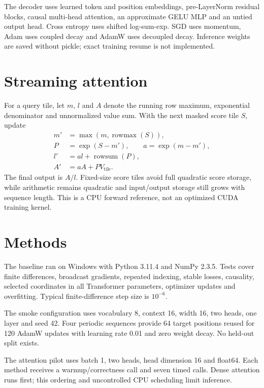 \documentclass[11pt]{article}
\begin{document}
The decoder uses learned token and position embeddings, pre-LayerNorm residual blocks, causal multi-head attention, an approximate GELU MLP and an untied output head. Cross entropy uses shifted log-sum-exp. SGD uses momentum, Adam uses coupled decay and AdamW uses decoupled decay. Inference weights are saved without pickle; exact training resume is not implemented.
\section{Streaming attention}
For a query tile, let $m$, $l$ and $A$ denote the running row maximum, exponential denominator and unnormalized value sum. With the next masked score tile $S$, update
\begin{align}
m' &= \max(m,\operatorname{rowmax}(S)),\\
P &= \exp(S-m'),\qquad a=\exp(m-m'),\\
l' &= a l+\operatorname{rowsum}(P),\\
A' &= a A+P V_{\mathrm{tile}}.
\end{align}
The final output is $A/l$. Fixed-size score tiles avoid full quadratic score storage, while arithmetic remains quadratic and input/output storage still grows with sequence length. This is a CPU forward reference, not an optimized CUDA training kernel.
\section{Methods}
The baseline ran on Windows with Python 3.11.4 and NumPy 2.3.5. Tests cover finite differences, broadcast gradients, repeated indexing, stable losses, causality, selected coordinates in all Transformer parameters, optimizer updates and overfitting. Typical finite-difference step size is $10^{-6}$.

The smoke configuration uses vocabulary 8, context 16, width 16, two heads, one layer and seed 42. Four periodic sequences provide 64 target positions reused for 120 AdamW updates with learning rate 0.01 and zero weight decay. No held-out split exists.

The attention pilot uses batch 1, two heads, head dimension 16 and float64. Each method receives a warmup/correctness call and seven timed calls. Dense attention runs first; this ordering and uncontrolled CPU scheduling limit inference.
\end{document}
